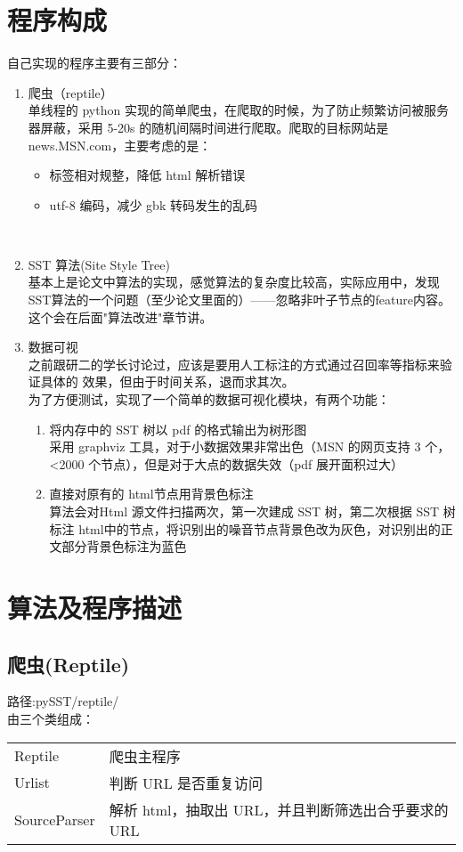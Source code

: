 \documentclass[a4paper]{ctexart}
\begin{document}
\section{程序构成}
自己实现的程序主要有三部分： 
\begin{enumerate}
    \item 爬虫（reptile）\\
    单线程的 python 实现的简单爬虫，在爬取的时候，为了防止频繁访问被服务器屏蔽，采用 5-20s 的随机间隔时间进行爬取。爬取的目标网站是 news.MSN.com，主要考虑的是： 
    \begin{itemize}  
        \item 标签相对规整，降低 html 解析错误 
        \item utf-8 编码，减少 gbk 转码发生的乱码 
    \end{itemize}
  \item SST 算法(Site Style Tree) \\
    基本上是论文中算法的实现，感觉算法的复杂度比较高，实际应用中，发现SST算法的一个问题（至少论文里面的）——忽略非叶子节点的feature内容。 这个会在后面"算法改进"章节讲。
  \item 数据可视 \\
    之前跟研二的学长讨论过，应该是要用人工标注的方式通过召回率等指标来验证具体的
效果，但由于时间关系，退而求其次。 \\
    为了方便测试，实现了一个简单的数据可视化模块，有两个功能： 
    \begin{enumerate}
        \item 将内存中的 SST 树以 pdf 的格式输出为树形图\\
        采用 graphviz 工具，对于小数据效果非常出色（MSN 的网页支持 3 个，<2000 个节点），但是对于大点的数据失效（pdf 展开面积过大） 
        \item 直接对原有的 html节点用背景色标注\\
        算法会对Html 源文件扫描两次，第一次建成 SST 树，第二次根据 SST 树标注 html中的节点，将识别出的噪音节点背景色改为灰色，对识别出的正文部分背景色标注为蓝色 
    \end{enumerate}
\end{enumerate}

\section{算法及程序描述}
\subsection{爬虫(Reptile)}
路径:pySST/reptile/ \\
由三个类组成： \\
\begin{tabular}[t]{ll}
    Reptile & 爬虫主程序 \\
    Urlist & 判断 URL 是否重复访问 \\
    SourceParser & 解析 html，抽取出 URL，并且判断筛选出合乎要求的 URL 
\end{tabular}
\end{document}
